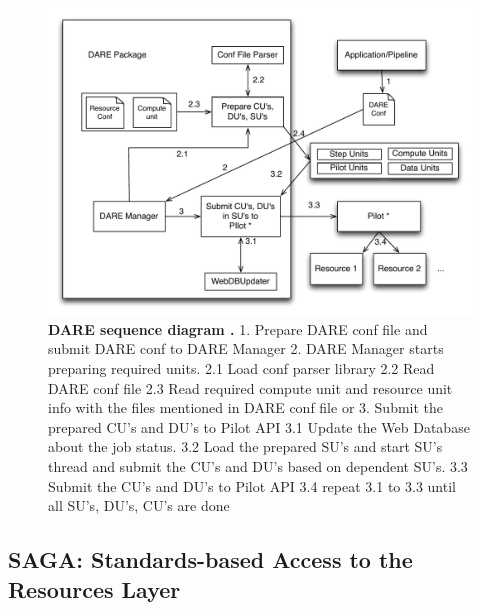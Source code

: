 \documentclass[]{svjour3}
\begin{document}
\begin{figure}[t]
\centering \includegraphics[width=1\textwidth]{figures/DARE_Sequence.pdf}
\caption{\textbf{ DARE sequence diagram .} 1. Prepare DARE conf file and submit DARE conf to DARE Manager 
2. DARE Manager starts preparing required units.
2.1 Load conf parser library
2.2 Read DARE conf file
2.3 Read required compute unit and resource unit info with the files mentioned in DARE conf file or
3. Submit the prepared CU's and DU's to Pilot API
3.1 Update the Web Database about the job status.
3.2 Load the prepared SU's and start SU's thread and submit the CU's and DU's based on dependent SU's.
3.3 Submit the CU's and DU's to Pilot API
3.4 repeat 3.1 to 3.3 until all SU's, DU's, CU's are done}
 \label{fig:dare-seqence}
\end{figure}


\subsection{SAGA: Standards-based Access to the Resources Layer}

\end{document}
